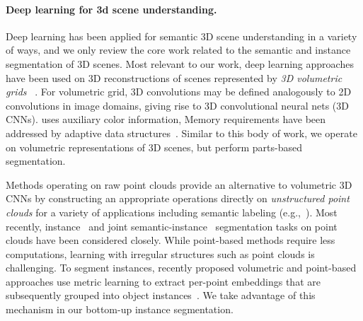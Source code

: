 
\paragraph{Deep learning for 3d scene understanding.}
\label{related:scene-understanding}
Deep learning has been applied for semantic 3D scene understanding in a variety of ways, and we only review the core work related to the semantic and instance segmentation of 3D scenes. 
Most relevant to our work, deep learning approaches have been used on 3D reconstructions of scenes represented by \emph{3D volumetric grids} ~\cite{dai2017scannet,dai20183dmv,hou20193d,liu2019masc}. For volumetric grid, 3D convolutions may be defined analogously to 2D convolutions in image domains, giving rise to 3D convolutional neural nets (3D CNNs).
\cite{dai20183dmv} uses auxiliary color information, 
Memory requirements have been addressed by adaptive data structures~\cite{wang2017cnn}.
Similar to this body of work, we operate on volumetric representations of 3D scenes, but perform parts-based segmentation. %

Methods operating on raw point clouds provide an alternative to volumetric 3D CNNs by constructing an appropriate operations directly on \emph{unstructured point clouds} for a variety of applications including semantic labeling (e.g.,~\cite{qi2017pointnet,qi2017pointnet++,klokov2017escape,wang2018sgpn,wang2019dynamic}). Most recently, instance~\cite{elich20193d,liang20193d,elich20193d,yi2019gspn,yang2019learning,zhang2019point,engelmann20203d} and joint semantic-instance~\cite{wang2019associatively,pham2019jsis3d} segmentation tasks on point clouds have been considered closely. While point-based methods require less computations, learning with irregular structures such as point clouds is challenging.
To segment instances, recently proposed volumetric and point-based approaches use metric learning  to extract per-point embeddings that are subsequently grouped into object instances~\cite{elich20193d,yi2019gspn,lahoud20193d,liu2019masc}. We take advantage of this mechanism in our bottom-up instance segmentation.



